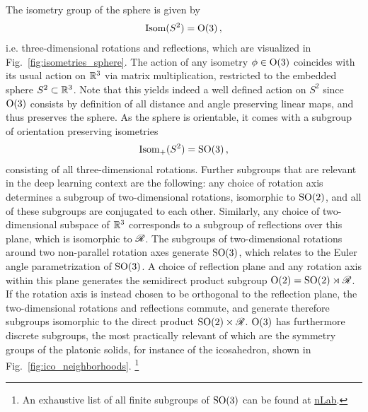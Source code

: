 The isometry group of the sphere is given by
\begin{align}
    \operatorname{Isom}(S^2) = \operatorname{O}(3) \,,
\end{align}
i.e. three-dimensional rotations and reflections, which are visualized in Fig.~\ref{fig:isometries_sphere}.
The action of any isometry $\phi\in\operatorname{O}(3)$ coincides with its usual action on $\mathbb{R}^3$ via matrix multiplication, restricted to the embedded sphere $S^2 \subset \mathbb{R}^3$.
Note that this yields indeed a well defined action on $S^2$ since $\operatorname{O}(3)$ consists by definition of all distance and angle preserving linear maps, and thus preserves the sphere.
As the sphere is orientable, it comes with a subgroup of orientation preserving isometries
\begin{align}
    \operatorname{Isom}_+(S^2) = \operatorname{SO}(3) \,,
\end{align}
consisting of all three-dimensional rotations.
Further subgroups that are relevant in the deep learning context are the following:
any choice of rotation axis determines a subgroup of two-dimensional rotations, isomorphic to $\operatorname{SO}(2)$, and all of these subgroups are conjugated to each other.
Similarly, any choice of two-dimensional subspace of $\mathbb{R}^3$ corresponds to a subgroup of reflections over this plane, which is isomorphic to $\mathscr{R}$.
The subgroups of two-dimensional rotations around two non-parallel rotation axes generate $\operatorname{SO}(3)$, which relates to the Euler angle parametrization of $\operatorname{SO}(3)$.
A choice of reflection plane and any rotation axis within this plane generates the semidirect product subgroup $\operatorname{O}(2) = \operatorname{SO}(2) \rtimes \mathscr{R}$.
If the rotation axis is instead chosen to be orthogonal to the reflection plane, the two-dimensional rotations and reflections commute, and generate therefore subgroups isomorphic to the direct product $\operatorname{SO}(2) \times \mathscr{R}$.
$\operatorname{O}(3)$ has furthermore discrete subgroups, the most practically relevant of which are the symmetry groups of the platonic solids, for instance of the icosahedron, shown in Fig.~\ref{fig:ico_neighborhoods}.%
\footnote{
    An exhaustive list of all finite subgroups of $\operatorname{SO}(3)$ can be found at \href{https://ncatlab.org/nlab/show/SO\%283\%29\#finite_subgroups}{nLab}.
}


